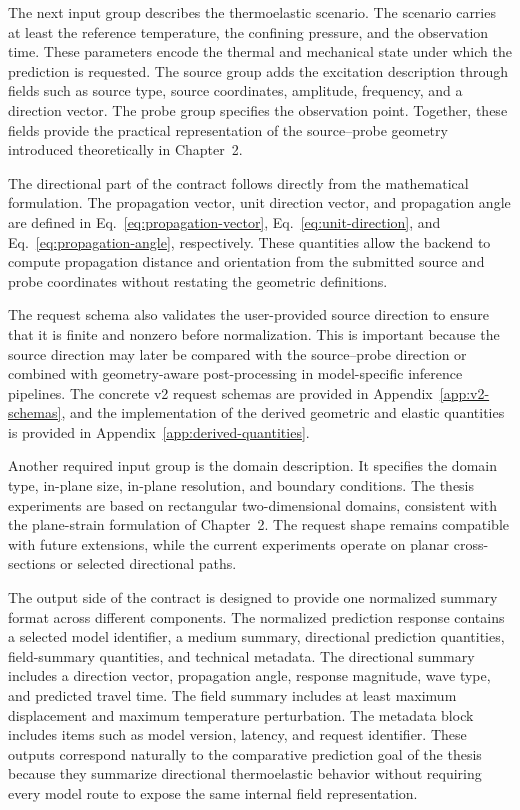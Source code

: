 The next input group describes the thermoelastic scenario. The scenario carries at least the reference temperature, the confining pressure, and the observation time. These parameters encode the thermal and mechanical state under which the prediction is requested. The source group adds the excitation description through fields such as source type, source coordinates, amplitude, frequency, and a direction vector. The probe group specifies the observation point. Together, these fields provide the practical representation of the source--probe geometry introduced theoretically in Chapter~2.

The directional part of the contract follows directly from the mathematical formulation. The propagation vector, unit direction vector, and propagation angle are defined in Eq.~\eqref{eq:propagation-vector}, Eq.~\eqref{eq:unit-direction}, and Eq.~\eqref{eq:propagation-angle}, respectively. These quantities allow the backend to compute propagation distance and orientation from the submitted source and probe coordinates without restating the geometric definitions.

The request schema also validates the user-provided source direction to ensure that it is finite and nonzero before normalization. This is important because the source direction may later be compared with the source--probe direction or combined with geometry-aware post-processing in model-specific inference pipelines. The concrete v2 request schemas are provided in Appendix~\ref{app:v2-schemas}, and the implementation of the derived geometric and elastic quantities is provided in Appendix~\ref{app:derived-quantities}.

Another required input group is the domain description. It specifies the domain type, in-plane size, in-plane resolution, and boundary conditions. The thesis experiments are based on rectangular two-dimensional domains, consistent with the plane-strain formulation of Chapter~2. The request shape remains compatible with future extensions, while the current experiments operate on planar cross-sections or selected directional paths.

The output side of the contract is designed to provide one normalized summary format across different components. The normalized prediction response contains a selected model identifier, a medium summary, directional prediction quantities, field-summary quantities, and technical metadata. The directional summary includes a direction vector, propagation angle, response magnitude, wave type, and predicted travel time. The field summary includes at least maximum displacement and maximum temperature perturbation. The metadata block includes items such as model version, latency, and request identifier. These outputs correspond naturally to the comparative prediction goal of the thesis because they summarize directional thermoelastic behavior without requiring every model route to expose the same internal field representation.

